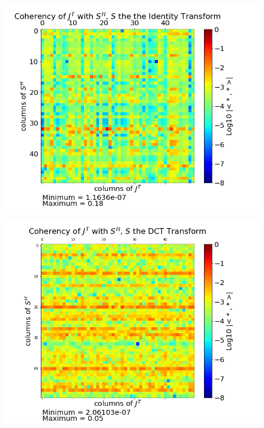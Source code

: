 \documentclass[twoside]{article}
\begin{document}
\begin{figure}[!ht]
\centering
\begin{minipage}{0.31\textwidth}
  \centering
    \includegraphics[width=.99\linewidth]{figures/Coherency_Identity.png}
  \label{Coh_Id}
\end{minipage}%
\begin{minipage}{.31\textwidth}
  \centering
  \includegraphics[width=.99\linewidth]{figures/Coherency_DCT.png}
  \label{Coh_DCT}

\end{minipage}
\end{figure}
\end{document}
